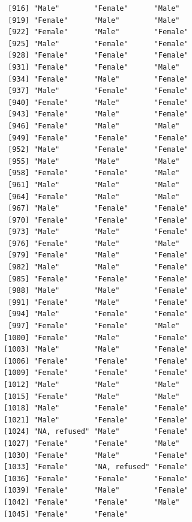 \documentclass{beamer}\usepackage[]{graphicx}\usepackage[]{color}
\makeatletter
\newenvironment{kframe}{%
 \def\at@end@of@kframe{}%
 \ifinner\ifhmode%
  \def\at@end@of@kframe{\end{minipage}}%
  \begin{minipage}{\columnwidth}%
 \fi\fi%
 \def\FrameCommand##1{\hskip\@totalleftmargin \hskip-\fboxsep
 \colorbox{shadecolor}{##1}\hskip-\fboxsep
     \hskip-\linewidth \hskip-\@totalleftmargin \hskip\columnwidth}%
 \MakeFramed {\advance\hsize-\width
   \@totalleftmargin\z@ \linewidth\hsize
   \@setminipage}}%
 {\par\unskip\endMakeFramed%
 \at@end@of@kframe}
\newenvironment{knitrout}{}{} %
\makeatother
\begin{document}
\begin{frame}[fragile]
\begin{knitrout}
\begin{kframe}
\begin{verbatim}
 [916] "Male"        "Female"      "Male"       
 [919] "Female"      "Male"        "Male"       
 [922] "Female"      "Male"        "Female"     
 [925] "Male"        "Female"      "Female"     
 [928] "Female"      "Female"      "Female"     
 [931] "Female"      "Female"      "Male"       
 [934] "Female"      "Male"        "Female"     
 [937] "Male"        "Female"      "Female"     
 [940] "Female"      "Male"        "Female"     
 [943] "Female"      "Male"        "Female"     
 [946] "Female"      "Male"        "Male"       
 [949] "Female"      "Female"      "Female"     
 [952] "Male"        "Female"      "Female"     
 [955] "Male"        "Male"        "Male"       
 [958] "Female"      "Female"      "Male"       
 [961] "Male"        "Male"        "Male"       
 [964] "Female"      "Male"        "Male"       
 [967] "Male"        "Female"      "Female"     
 [970] "Female"      "Female"      "Female"     
 [973] "Male"        "Male"        "Female"     
 [976] "Female"      "Male"        "Male"       
 [979] "Female"      "Male"        "Female"     
 [982] "Male"        "Male"        "Female"     
 [985] "Female"      "Female"      "Female"     
 [988] "Male"        "Male"        "Female"     
 [991] "Female"      "Male"        "Female"     
 [994] "Male"        "Female"      "Female"     
 [997] "Female"      "Female"      "Male"       
[1000] "Female"      "Male"        "Female"     
[1003] "Male"        "Male"        "Female"     
[1006] "Female"      "Female"      "Female"     
[1009] "Female"      "Female"      "Female"     
[1012] "Male"        "Male"        "Male"       
[1015] "Female"      "Male"        "Male"       
[1018] "Male"        "Female"      "Female"     
[1021] "Male"        "Female"      "Female"     
[1024] "NA, refused" "Male"        "Female"     
[1027] "Female"      "Female"      "Male"       
[1030] "Female"      "Male"        "Female"     
[1033] "Female"      "NA, refused" "Female"     
[1036] "Female"      "Female"      "Female"     
[1039] "Female"      "Male"        "Female"     
[1042] "Female"      "Female"      "Male"       
[1045] "Female"      "Female"     
\end{verbatim}
\end{kframe}
\end{knitrout}
\end{frame}
\end{document}
